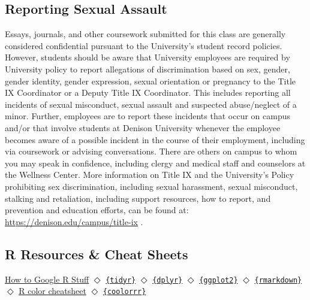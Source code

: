 \documentclass[11pt,]{article}
\begin{document}
\hypertarget{reporting-sexual-assault}{%
\subsection{Reporting Sexual Assault}\label{reporting-sexual-assault}}

Essays, journals, and other coursework submitted for this class are
generally considered confidential pursuant to the University's student
record policies. However, students should be aware that University
employees are required by University policy to report allegations of
discrimination based on sex, gender, gender identity, gender expression,
sexual orientation or pregnancy to the Title IX Coordinator or a Deputy
Title IX Coordinator. This includes reporting all incidents of sexual
misconduct, sexual assault and suspected abuse/neglect of a minor.
Further, employees are to report these incidents that occur on campus
and/or that involve students at Denison University whenever the employee
becomes aware of a possible incident in the course of their employment,
including via coursework or advising conversations. There are others on
campus to whom you may speak in confidence, including clergy and medical
staff and counselors at the Wellness Center. More information on Title
IX and the University's Policy prohibiting sex discrimination, including
sexual harassment, sexual misconduct, stalking and retaliation,
including support resources, how to report, and prevention and education
efforts, can be found at: \url{https://denison.edu/campus/title-ix} .

\hypertarget{r-resources-cheat-sheets}{%
\subsection{R Resources \& Cheat
Sheets}\label{r-resources-cheat-sheets}}

\href{https://www.r-bloggers.com/2021/12/how-to-google-r-stuff/}{How to
Google R Stuff} \(\Diamond\)
\href{https://github.com/rstudio/cheatsheets/blob/main/tidyr.pdf}{\texttt{\{tidyr\}}}
\(\Diamond\)
\href{https://github.com/rstudio/cheatsheets/blob/main/data-transformation.pdf}{\texttt{\{dplyr\}}}
\(\Diamond\)
\href{https://github.com/rstudio/cheatsheets/blob/main/data-visualization-2.1.pdf}{\texttt{\{ggplot2\}}}
\(\Diamond\)
\href{https://github.com/rstudio/cheatsheets/blob/main/rmarkdown-2.0.pdf}{\texttt{\{rmarkdown\}}}
\(\Diamond\)
\href{https://www.nceas.ucsb.edu/sites/default/files/2020-04/colorPaletteCheatsheet.pdf}{R
color cheatsheet} \(\Diamond\)
\href{https://github.com/milesdwilliams15/coolorrr}{\texttt{\{coolorrr\}}}
\end{document}
